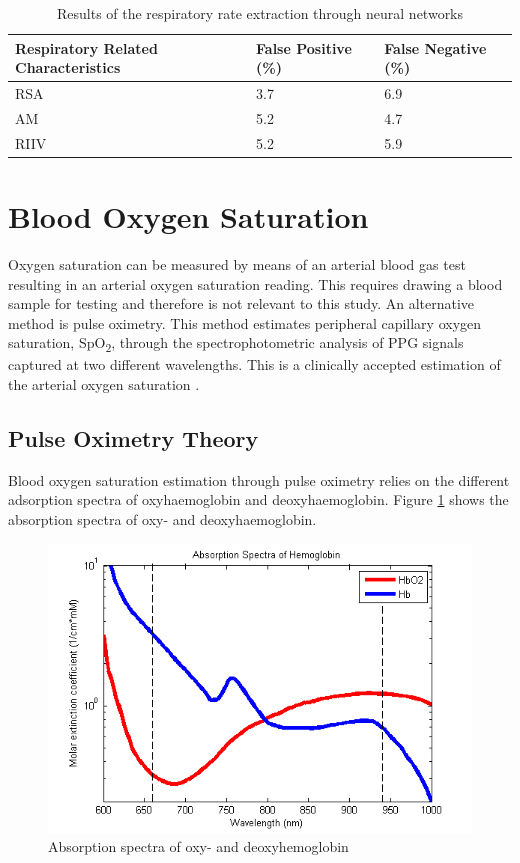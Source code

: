 \begin{table}[H]
\centering
\caption{Results of the respiratory rate extraction through neural networks \citep{johansson2003neural}}
\begin{tabular}{P{5cm}P{3cm}P{3cm}}
 \hline
 Respiratory Related Characteristics & False Positive (\%) & False Negative (\%) \\ 
 \hline
 RSA  	& 	3.7 	& 	6.9 \\  
 AM 	& 	5.2 	& 	4.7 \\
 RIIV 	&	5.2		&	5.9 \\
 \hline
\end{tabular}
\label{table:RRC}
\end{table}


\section{Blood Oxygen Saturation}
Oxygen saturation can be measured by means of an arterial blood gas test resulting in an arterial oxygen saturation reading. This requires drawing a blood sample for testing and therefore is not relevant to this study. An alternative method is pulse oximetry. This method estimates peripheral capillary oxygen saturation, SpO\textsubscript{2}, through the spectrophotometric analysis of PPG signals captured at two different wavelengths. This is a clinically accepted estimation of the arterial oxygen saturation \citep{aoyagi2003pulse}.

\subsection{Pulse Oximetry Theory}
Blood oxygen saturation estimation through pulse oximetry relies on the different adsorption spectra of oxyhaemoglobin and deoxyhaemoglobin. Figure \ref{fig:AbsorptionSpectra} shows the absorption spectra of oxy- and deoxyhaemoglobin. 

\medskip
\begin{figure}[H]
   \centering
   \includegraphics[scale=0.8]{figs/AbsorptionSpectra_Edit}
   \caption{Absorption spectra of oxy- and deoxyhemoglobin}
   \label{fig:AbsorptionSpectra}
\end{figure}

